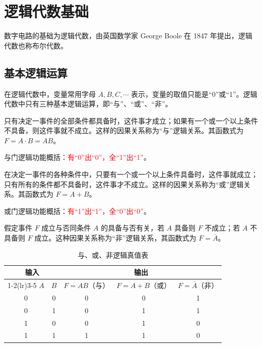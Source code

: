 \section{逻辑代数基础}
\label{sec:逻辑代数基础}

数字电路的基础为逻辑代数，由英国数学家 George Boole 在 1847 年提出，逻辑代数也称布尔代数。

\subsection{基本逻辑运算}
\label{sec:基本逻辑运算}

在逻辑代数中，变量常用字母 $A,B,C,\cdots$ 表示，变量的取值只能是“0”或“1”。逻辑代数中只有三种基本逻辑运算，即“与”、“或”、“非”。

\begin{definition}[与逻辑运算]
\label{def:与逻辑}
只有决定一事件的全部条件都具备时，这件事才成立；如果有一个或一个以上条件不具备，则这件事就不成立。这样的因果关系称为“与”逻辑关系。其函数式为 $F=A\cdot B=AB$。

与门逻辑功能概括：\textcolor{red}{有“0”出“0”，全“1”出“1”}。
\end{definition}

\begin{definition}[或逻辑运算]
\label{def:或逻辑}
在决定一事件的各种条件中，只要有一个或一个以上条件具备时，这件事就成立；只有所有的条件都不具备时，这件事才不成立。这样的因果关系称为“或”逻辑关系。其函数式为 $F=A+B$。

或门逻辑功能概括：\textcolor{red}{有“1”出“1”，全“0”出“0”}。
\end{definition}

\begin{definition}[非逻辑运算]
\label{def:非逻辑}
假定事件 $F$ 成立与否同条件 $A$ 的具备与否有关，若 $A$ 具备则 $F$ 不成立；若 $A$ 不具备则 $F$ 成立。这种因果关系称为“非”逻辑关系，其函数式为 $F=\overline{A}$。
\end{definition}

\begin{table}[H]
\centering
\caption{与、或、非逻辑真值表}
\label{tab:真值表:基本运算}
\begin{tabular}{cc|ccc}
	\toprule
	\multicolumn{2}{c|}{输入} & \multicolumn{3}{c}{输出} \\
	\cmidrule(lr){1-2}\cmidrule(lr){3-5}
	$A$ & $B$ & $F=AB$（与） & $F=A+B$（或） & $F=\overline{A}$（非） \\
	\midrule
	0 & 0 & 0 & 0 & 1 \\
	0 & 1 & 0 & 1 & 1 \\
	1 & 0 & 0 & 1 & 0 \\
	1 & 1 & 1 & 1 & 0 \\
	\bottomrule
\end{tabular}
\end{table}


